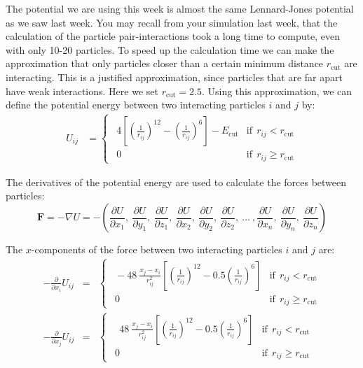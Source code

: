 \documentclass{article}
\begin{document}
The potential we are using this week is almost the same Lennard-Jones potential as we saw last week.
You may recall from your simulation last week, that the calculation of the particle pair-interactions took a long time to compute, even with only 10-20 particles.
To speed up the calculation time we can make the approximation that only particles closer than a certain minimum distance $r_{\mathrm{cut}}$ are interacting.
This is a justified approximation, since particles that are far apart have weak interactions.
Here we set $r_{\mathrm{cut}} = 2.5$.
Using this approximation, we can define the potential energy between two interacting particles $i$ and $j$ by:
\begin{eqnarray}
    U_{ij} &= 
    \begin{cases}
        \ \ 4 \left[ \left(\frac{1}{r_{ij}} \right)^{12} - \left(\frac{1}{r_{ij}} \right)^6 \right] -E_{\mathrm{cut}} & \mathrm{if}\ \ r_{ij} < r_{\mathrm{cut}}\\
        \ \ 0 & \mathrm{if}\ \ r_{ij} \ge  r_{\mathrm{cut}}
    \end{cases}
\end{eqnarray}

The derivatives of the potential energy are used to calculate the forces
between particles:
\begin{equation}
    \mathbf{F} = -\nabla U =
    -\left(
        \frac{\partial U}{\partial x_1},\
        \frac{\partial U}{\partial y_1},\
        \frac{\partial U}{\partial z_1},\
        \frac{\partial U}{\partial x_2},\
        \frac{\partial U}{\partial y_2},\
        \frac{\partial U}{\partial z_2},\
        \ldots\ ,
        \frac{\partial U}{\partial x_n},\
        \frac{\partial U}{\partial y_n},\
        \frac{\partial U}{\partial z_n}
    \right)
\end{equation}

The $x$-components of the force between two interacting particles $i$ and $j$
are:
\begin{eqnarray}
    -\frac{\partial}{\partial x_i} U_{ij}&=& 
    \begin{cases}
        \ \ -48\ \frac{x_j - x_i}{r^2_{ij}}
        \left[ \left(\frac{1}{r_{ij}} \right)^{12} - 0.5 \left(\frac{1}{r_{ij}} \right)^6 \right]
        & \mathrm{if}\ \ r_{ij} < r_{\mathrm{cut}} \\
        \ \ 0 & \mathrm{if}\ \ r_{ij} \ge  r_{\mathrm{cut}}
    \end{cases}\label{eq:force_i}\\
    -\frac{\partial}{\partial x_j} U_{ij}&=&
    \begin{cases}
        \ \ \ \ 48\ \frac{x_j - x_i}{r^2_{ij}}
        \left[ \left(\frac{1}{r_{ij}} \right)^{12} - 0.5 \left(\frac{1}{r_{ij}} \right)^6 \right]
        & \mathrm{if}\ \ r_{ij} < r_{\mathrm{cut}} \\
        \ \ 0 & \mathrm{if}\ \ r_{ij} \ge  r_{\mathrm{cut}}
    \end{cases}\label{eq:force_j}
\end{eqnarray}
\end{document}
